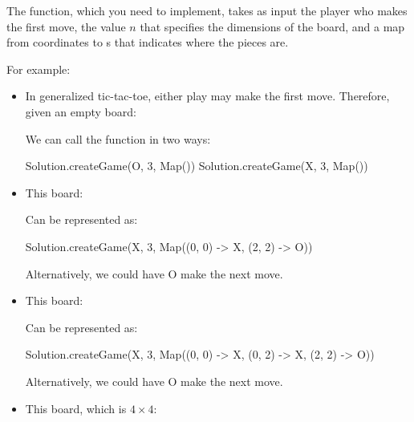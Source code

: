 \documentclass{book}
\begin{document}
The  function, which you need to implement,
takes as input the player who makes the first move, the
value $n$ that specifies the dimensions of the board, and a map from coordinates to s
that indicates where the pieces are.

For example:

\begin{itemize}

  \item In generalized tic-tac-toe, either play may make the first move.
  Therefore, given an empty board:


  We can call the function in two ways:

  \begin{scalacode}
  Solution.createGame(O, 3, Map())
  Solution.createGame(X, 3, Map())
  \end{scalacode}

\item This board:


Can be represented as:
\begin{scalacode}
Solution.createGame(X, 3, Map((0, 0) -> X, (2, 2) -> O))
\end{scalacode}
Alternatively, we could have O make the next move.

\item This board:


Can be represented as:
\begin{scalacode}
Solution.createGame(X, 3, Map((0, 0) -> X, (0, 2) -> X, (2, 2) -> O))
\end{scalacode}
Alternatively, we could have O make the next move.


\item This board, which is $4 \times 4$:


\end{itemize}
\end{document}
